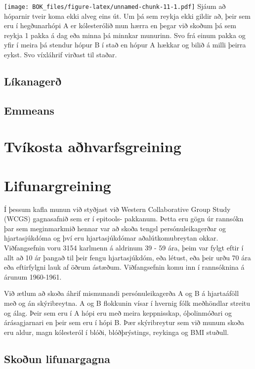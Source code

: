 \documentclass[
]{book}
\begin{document}
\texttt{[image: BOK\_files/figure-latex/unnamed-chunk-11-1.pdf]}
Sjáum að hóparnir tveir koma ekki alveg eins út. Um þá sem reykja ekki gildir að, þeir sem eru í hegðunarhópi A er kólesterólið mun hærra en þegar við skoðum þá sem reykja 1 pakka á dag eða minna þá minnkar munurinn. Svo frá einum pakka og yfir í meira þá stendur hópur B í stað en hópur A hækkar og bilið á milli þeirra eykst. Svo víxláhrif virðast til staðar.

\hypertarget{luxedkanageruxf0}{%
\section{Líkanagerð}\label{luxedkanageruxf0}}

\hypertarget{emmeans}{%
\section{Emmeans}\label{emmeans}}

\hypertarget{tvuxedkosta-auxf0hvarfsgreining}{%
\chapter{Tvíkosta aðhvarfsgreining}\label{tvuxedkosta-auxf0hvarfsgreining}}

\hypertarget{lif}{%
\chapter{Lifunargreining}\label{lif}}

Í þessum kafla munun við styðjast við Western Collaborative Group Study (WCGS) gagnasafnið sem er í epitools- pakkanum. Þetta eru gögn úr rannsókn þar sem meginmarkmið hennar var að skoða tengsl persónuleikagerðar og hjartasjúkdóma og því eru hjartasjúkdómar aðalútkomubreytan okkar. Viðfangsefnin voru 3154 karlmenn á aldrinum 39 - 59 ára, þeim var fylgt eftir í allt að 10 ár þangað til þeir fengu hjartasjúkdóm, eða létust, eða þeir urðu 70 ára eða eftirfylgni lauk af öðrum ástæðum. Viðfangsefnin komu inn í rannsóknina á árunum 1960-1961.

Við ætlum að skoða áhrif mismunandi persónuleikagerða A og B á hjartaáföll með og án skýribreytna. A og B flokkunin vísar í hvernig fólk meðhöndlar streitu og álag. Þeir sem eru í A hópi eru með meira keppnisskap, óþolinmóðari og árásagjarnari en þeir sem eru í hópi B. Þær skýribreytur sem við munum skoða eru aldur, magn kólesteról í blóði, blóðþrýstings, reykinga og BMI stuðull.

\hypertarget{lif_skod}{%
\section{Skoðun lifunargagna}\label{lif_skod}}
\end{document}
